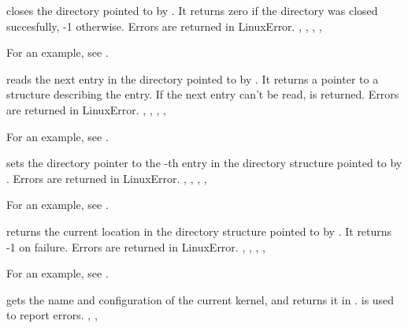 

{  closes the directory pointed to by .
It returns zero if the directory was closed succesfully, -1 otherwise.}
{Errors are returned in LinuxError.}
{, , , ,
}

For an example, see .

{ reads the next entry in the directory pointed to by .
It returns a  pointer to a structure describing the entry.
If the next entry can't be read,  is returned.
}
{Errors are returned in LinuxError.}
{, , , ,
}

For an example, see .

{  sets the directory pointer to the -th entry in the
directory structure pointed to by .}
{Errors are returned in LinuxError.}
{, , , ,
}

For an example, see .

{  returns the current location in the directory structure
pointed to by . It returns -1 on failure.}
{Errors are returned in LinuxError.}
{, , , ,
}

For an example, see .

{ gets the name and configuration of the current \linux kernel,
and returns it in .
}
{ is used to report errors.}
{, , }

